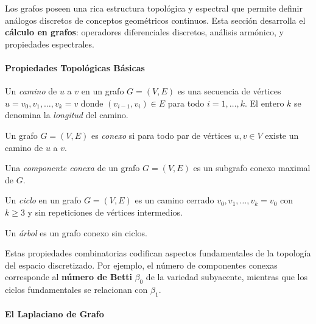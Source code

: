 Los grafos poseen una rica estructura topológica y espectral que permite definir análogos discretos de conceptos geométricos continuos. Esta sección desarrolla el \textbf{cálculo en grafos}: operadores diferenciales discretos, análisis armónico, y propiedades espectrales.

\paragraph{Propiedades Topológicas Básicas}

\begin{definition}\label{def:camino_grafo}
	Un \textit{camino} de $u$ a $v$ en un grafo $G = (V,E)$ es una secuencia de vértices $u = v_0, v_1, \ldots, v_k = v$ donde $(v_{i-1}, v_i) \in E$ para todo $i = 1, \ldots, k$. El entero $k$ se denomina la \textit{longitud} del camino.
\end{definition}

\begin{definition}\label{def:grafo_conexo}
	Un grafo $G = (V,E)$ es \textit{conexo} si para todo par de vértices $u, v \in V$ existe un camino de $u$ a $v$.
\end{definition}

\begin{definition}\label{def:componente_conexa}
	Una \textit{componente conexa} de un grafo $G = (V,E)$ es un subgrafo conexo maximal de $G$.
\end{definition}

\begin{definition}[Ciclo]\label{def:ciclo_grafo}
	Un \textit{ciclo} en un grafo $G = (V,E)$ es un camino cerrado $v_0, v_1, \ldots, v_k = v_0$ con $k \geq 3$ y sin repeticiones de vértices intermedios.
\end{definition}

\begin{definition}[Árbol]\label{def:arbol_grafo}
	Un \textit{árbol} es un grafo conexo sin ciclos.
\end{definition}

Estas propiedades combinatorias codifican aspectos fundamentales de la topología del espacio discretizado. Por ejemplo, el número de componentes conexas corresponde al \textbf{número de Betti} $\beta_0$ de la variedad subyacente, mientras que los ciclos fundamentales se relacionan con $\beta_1$.

\paragraph{El Laplaciano de Grafo}

